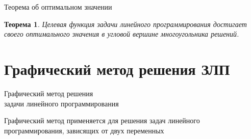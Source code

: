 \documentclass[unicode,11pt,notheorems]{beamer}
\newtheorem{theorem}{Теорема}
\begin{document}
\begin{frame}{Теорема об оптимальном значении}{}
\begin{theorem}
	Целевая функция задачи линейного программирования достигает своего оптимального значения в угловой вершине многоугольника решений. 
\end{theorem}

%
%	
%
%
%	
\end{frame}   
%
%
%


\section{Графический метод решения ЗЛП}
\begin{frame}[t]{}{}
\vspace{2cm}
{\LARGE	Графический метод решения\\ задачи линейного программирования\par}
\vspace{\fill}

{\begin{alertblock}{Графический метод}
применяется для решения задач линейного программирования, зависящих от двух переменных
\end{alertblock}}
\end{frame}   
\end{document}
